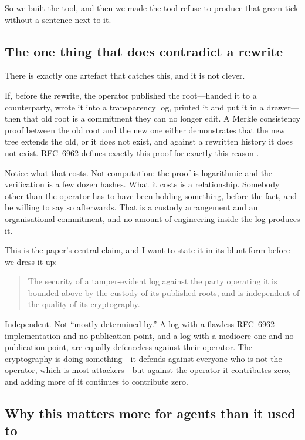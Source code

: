 \documentclass[11pt]{article}
\begin{document}
So we built the tool, and then we made the tool refuse to produce that green
tick without a sentence next to it.

\subsection{The one thing that does contradict a rewrite}

There is exactly one artefact that catches this, and it is not clever.

If, before the rewrite, the operator published the root---handed it to a
counterparty, wrote it into a transparency log, printed it and put it in a
drawer---then that old root is a commitment they can no longer edit. A
Merkle consistency proof between the old root and the new one either
demonstrates that the new tree extends the old, or it does not exist, and
against a rewritten history it does not exist. RFC~6962 defines exactly this
proof for exactly this reason \cite{rfc6962}.

Notice what that costs. Not computation: the proof is logarithmic and the
verification is a few dozen hashes. What it costs is a relationship. Somebody
other than the operator has to have been holding something, before the fact,
and be willing to say so afterwards. That is a custody arrangement and an
organisational commitment, and no amount of engineering inside the log
produces it.

This is the paper's central claim, and I want to state it in its blunt form
before we dress it up:

\begin{quote}
The security of a tamper-evident log against the party operating it is
bounded above by the custody of its published roots, and is independent of
the quality of its cryptography.
\end{quote}

Independent. Not ``mostly determined by.'' A log with a flawless RFC~6962
implementation and no publication point, and a log with a mediocre one and no
publication point, are equally defenceless against their operator. The
cryptography is doing something---it defends against everyone who is not the
operator, which is most attackers---but against the operator it contributes
zero, and adding more of it continues to contribute zero.

\subsection{Why this matters more for agents than it used to}
\end{document}
